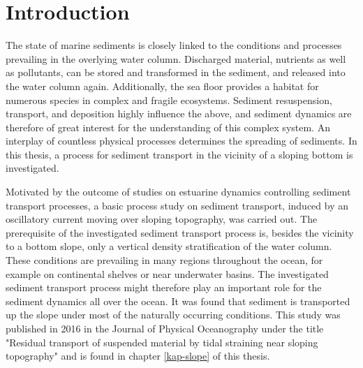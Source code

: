 \chapter{Introduction}
\label{kap-intro}


% 

The state of marine sediments is closely linked to the conditions and 
processes prevailing in the overlying water column. Discharged material, 
nutrients as well as pollutants, can be stored and transformed in the 
sediment, and released into the water column again. Additionally, the sea floor 
provides a habitat for numerous species in complex and fragile ecosystems. 
Sediment resuspension, transport, and deposition highly influence the above, 
and sediment dynamics are therefore of great interest for the understanding of 
this complex system. An interplay of countless physical processes determines 
the spreading of sediments. In this thesis, a process for sediment transport in 
the vicinity of a sloping bottom is investigated. 

Motivated by the outcome of studies on estuarine dynamics controlling sediment 
transport processes, a basic process study on sediment transport, induced by an 
oscillatory current moving over sloping topography, was carried out. The 
prerequisite of the investigated sediment transport process is, besides the 
vicinity to a bottom slope, only a vertical density stratification of the water 
column. These conditions are prevailing in many regions throughout the ocean, 
for example on continental shelves or near underwater basins. The investigated 
sediment transport process might therefore play an important role for 
the sediment dynamics all over the ocean. It was found that sediment is 
transported up the slope under most of the naturally occurring conditions. This 
study was published in 2016 in the Journal of Physical Oceanography under the 
title "Residual transport of suspended material by tidal straining near sloping 
topography" and is found in chapter \ref{kap-slope} of this thesis. 

